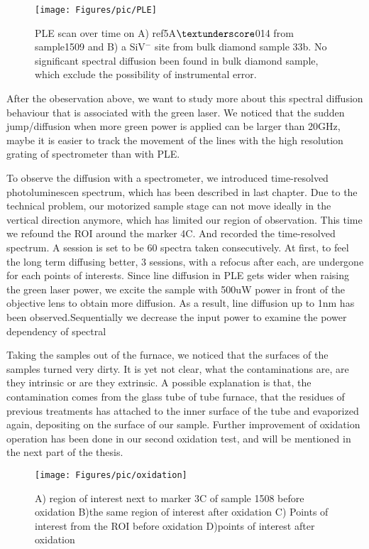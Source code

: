 \begin{figure}[h]
\centering
\texttt{[image: Figures/pic/PLE]}
\caption{PLE scan over time on A) ref5A$\textunderscore$014 from sample1509 and B) a SiV$^{-}$ site from bulk diamond sample 33b. No significant spectral diffusion been found in bulk diamond sample, which exclude the possibility of instrumental error.}
\label{fig:ple}
\end{figure}

After the obeservation above, we want to study more about this spectral diffusion behaviour that is associated with the green laser. We noticed that the sudden jump/diffusion when more green power is applied can be larger than 20GHz, maybe it is easier to track the movement of the lines with the high resolution grating of spectrometer than with PLE.

To observe the diffusion with a spectrometer, we introduced time-resolved photoluminescen spectrum, which has been described in last chapter. Due to the technical problem, our motorized sample stage can not move ideally in the vertical direction anymore, which has limited our region of observation. This time we refound the ROI around the marker 4C. And recorded the time-resolved spectrum. A session is set to be 60 spectra taken consecutively. At first, to feel the long term diffusing better, 3 sessions, with a refocus after each, are undergone for each points of interests. Since line diffusion in PLE gets wider when raising the green laser power, we excite the sample with 500uW power in front of the objective lens to obtain more diffusion. As a result, line diffusion up to 1nm has been observed.Sequentially we decrease the input power to examine the power dependency of spectral

Taking the samples out of the furnace, we noticed that the surfaces of the samples turned very dirty. It is yet not clear, what the contaminations are, are they intrinsic or are they extrinsic. A possible explanation is that, the contamination comes from the glass tube of tube furnace, that the residues of previous treatments has attached to the inner surface of the tube and evaporized again, depositing on the surface of our sample. Further improvement of oxidation operation has been done in our second oxidation test, and will be mentioned in the next part of the thesis.
\begin{figure}[h]
\centering
\texttt{[image: Figures/pic/oxidation]}
\caption{A) region of interest next to marker 3C of sample 1508 before oxidation B)the same region of interest after oxidation C) Points of interest from the ROI before oxidation D)points of interest after oxidation}
\label{fig:oxidation}
\end{figure}

